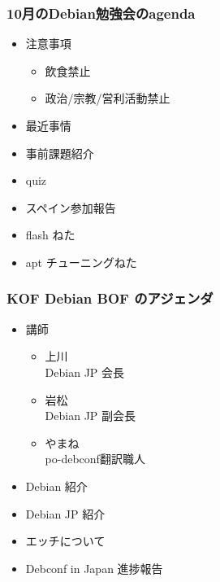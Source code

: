 \documentclass[cjk,dvipdfmx]{beamer}
\begin{document}
\begin{frame}
 \frametitle{10月のDebian勉強会のagenda}
\begin{minipage}[t]{0.4\hsize}
  \begin{itemize}
  \item 注意事項
	\begin{itemize}
	 \item 飲食禁止
	 \item 政治/宗教/営利活動禁止
	\end{itemize}
  \item 最近事情
  \item 事前課題紹介
  \item quiz
 \end{itemize}
\end{minipage} 
\begin{minipage}[t]{0.4\hsize}
\begin{itemize}
  \item スペイン参加報告
  \item flash ねた
  \item apt チューニングねた
 \end{itemize}
\end{minipage}
\end{frame}


\begin{frame}
 \frametitle{KOF Debian BOF のアジェンダ}
\begin{minipage}[t]{0.4\hsize}
  \begin{itemize}
  \item 講師
	\begin{itemize} 
	 \item 上川\\
	       Debian JP 会長
	 \item 岩松\\
	       Debian JP 副会長
	 \item やまね\\
	       po-debconf翻訳職人
	\end{itemize}
 \end{itemize}
\end{minipage} 
\begin{minipage}[t]{0.4\hsize}
 \begin{itemize}
  \item Debian 紹介
  \item Debian JP 紹介
  \item エッチについて
  \item Debconf in Japan 進捗報告
 \end{itemize}
\end{minipage}
\end{frame}
\end{document}

